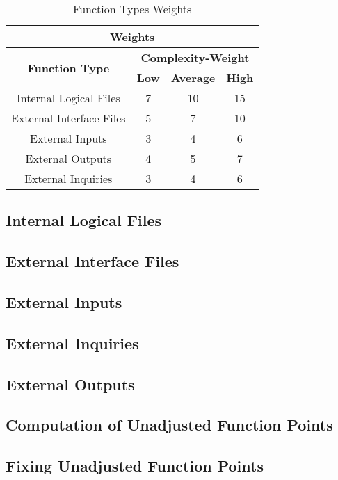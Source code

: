 \documentclass[../../../../projectPlan.tex]{subfiles}
\begin{document}
		\begin{table}[]
		\centering
		\label{my-label}
		\begin{tabular}{cccc}
			\hline
			\multicolumn{4}{c}{\textbf{Weights}}                                                                           \\ \hline
			\multicolumn{1}{c|}{\multirow{2}{*}{\textbf{Function Type}}} & \multicolumn{3}{c|}{\textbf{Complexity-Weight}} \\
			\multicolumn{1}{c|}{}                                        & \textbf{Low} & \textbf{Average} & \textbf{High} \\ \hline
			\multicolumn{1}{c|}{Internal Logical Files}                  & 7            & 10               & 15            \\ \hline
			\multicolumn{1}{c|}{External Interface Files}                & 5            & 7                & 10            \\ \hline
			\multicolumn{1}{c|}{External Inputs}                         & 3            & 4                & 6             \\ \hline
			\multicolumn{1}{c|}{External Outputs}                        & 4            & 5                & 7             \\ \hline
			\multicolumn{1}{c|}{External Inquiries}                      & 3            & 4                & 6             \\ \hline
		\end{tabular}
		\caption{Function Types Weights}
		\end{table}

		\subsection{Internal Logical Files}



		\subsection{External Interface Files}

		\subsection{External Inputs}

		\subsection{External Inquiries}

		\subsection{External Outputs}

		\subsection{Computation of Unadjusted Function Points}

		\subsection{Fixing Unadjusted Function Points}
\end{document}
